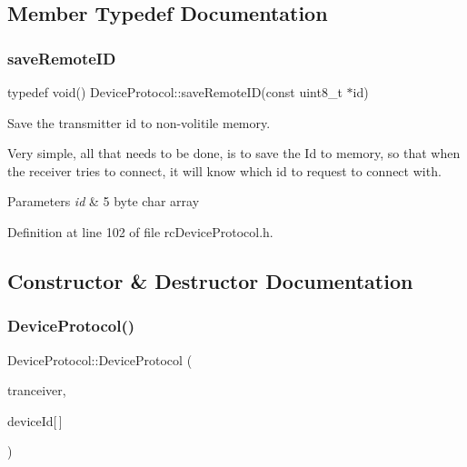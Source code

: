\subsection{Member Typedef Documentation}
\mbox{\label{classDeviceProtocol_a1d33bbf35f5c6e7bb888eb06fc50c070}} 
\subsubsection{\texorpdfstring{save\+Remote\+ID}{saveRemoteID}}
{\footnotesize\ttfamily typedef void() Device\+Protocol\+::save\+Remote\+ID(const uint8\+\_\+t $\ast$id)}

Save the transmitter id to non-\/volitile memory.

Very simple, all that needs to be done, is to save the Id to memory, so that when the receiver tries to connect, it will know which id to request to connect with.


\begin{DoxyParams}{Parameters}
{\em id} & 5 byte char array \\
\hline
\end{DoxyParams}


Definition at line 102 of file rc\+Device\+Protocol.\+h.



\subsection{Constructor \& Destructor Documentation}
\mbox{\label{classDeviceProtocol_aab81f811050405c0bc4b2c1e6b77f2b1}} 
\subsubsection{\texorpdfstring{Device\+Protocol()}{DeviceProtocol()}}
{\footnotesize\ttfamily Device\+Protocol\+::\+Device\+Protocol (\begin{DoxyParamCaption}\item[{R\+F24 $\ast$}]{tranceiver,  }\item[{const uint8\+\_\+t}]{device\+Id\mbox{[}$\,$\mbox{]} }\end{DoxyParamCaption})}

